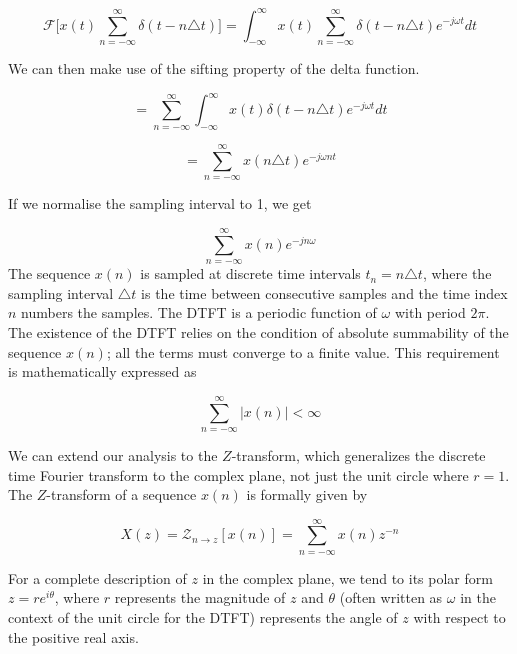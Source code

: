 \documentclass[a4paper]{report}
\begin{document}
\begin{equation}
\mathcal{F}\bigg[x(t) \sum^{\infty}_{n = -\infty} \delta(t - n \triangle t)\bigg] = \int^{\infty}_{-\infty} x(t)	 \sum_{n = - \infty}^{\infty} \delta (t - n\triangle t)e^{-j\omega t} dt 
\end{equation}

\noindent We can then make use of the sifting property of the delta function.

\begin{equation}
	= \sum_{n = - \infty}^{\infty} \int^{\infty}_{-\infty} x(t) \delta (t - n\triangle t)e^{-j\omega t} dt 
\end{equation}

\begin{equation}
	= \sum^{\infty}_{n=-\infty} x(n \triangle t)e^{-j\omega nt}
\end{equation}

\noindent If we normalise the sampling interval to 1, we get

\begin{equation}\label{dtft}
	\sum^{\infty}_{n = - \infty} x(n)e^{-j n \omega}
\end{equation}
The sequence $x(n)$ is sampled at discrete time intervals $t_n = n \triangle t$, where the sampling interval $\triangle t$ is the time between consecutive samples and the time index $n$ numbers the samples. The DTFT is a periodic function of $\omega$ with period $2\pi$. The existence of the DTFT relies on the condition of absolute summability of the sequence $x(n)$; all the terms must converge to a finite value. This requirement is mathematically expressed as

\begin{equation}
	\sum^{\infty}_{n = -\infty} |x(n)| < \infty
\end{equation}

We can extend our analysis to the $Z$-transform, which generalizes the discrete time Fourier transform to the complex plane, not just the unit circle where $r = 1$. The $Z$-transform of a sequence $x(n)$ is formally given by

\begin{equation}\label{bilateral_z-transform}
	X(z) = \mathcal{Z}_{n \rightarrow z}[x(n)] = \sum^{\infty}_{n = -\infty} x(n)z^{-n}
\end{equation}

For a complete description of $z$ in the complex plane, we tend to its polar form $z = re^{i\theta}$, where $r$ represents the magnitude of $z$ and $\theta$ (often written as $\omega$ in the context of the unit circle for the DTFT) represents the angle of $z$ with respect to the positive real axis.
\end{document}
